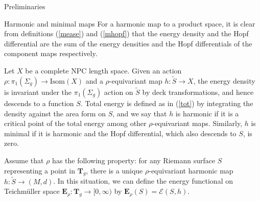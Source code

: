\documentclass[10pt]{amsart}
\theoremstyle{definition}
\begin{document}
\begin{section}{Preliminaries}
\begin{subsection}{Harmonic and minimal maps}
For a harmonic map to a product space, it is clear from definitions (\ref{mease}) and (\ref{mhopf}) that the energy density and the Hopf differential are the sum of the energy densities and the Hopf differentials of the component maps respectively.

Let $X$ be a complete NPC length space. Given an action $\rho:\pi_1(\Sigma_g)\to \textrm{Isom}(X)$ and a $\rho$-equivariant map $h:\tilde{S}\to X$, the energy density is invariant under the $\pi_1(\Sigma_g)$ action on $\tilde{S}$ by deck transformations, and hence descends to a function $S$. Total energy is defined as in (\ref{tot}) by integrating the density against the area form on $S$, and we say that $h$ is harmonic if it is a critical point of the total energy among other $\rho$-equivariant maps. Similarly, $h$ is minimal if it is harmonic and the Hopf differential, which also descends to $S$, is zero.

Assume that $\rho$ has the following property: for any Riemann surface $S$ representing a point in $\mathbf{T}_g$, there is a unique $\rho$-equivariant harmonic map $h:\tilde{S}\to (M,d)$. In this situation, we can define the energy functional on Teichm{\"u}ller space $\mathbf{E}_\rho:\mathbf{T}_g\to [0,\infty)$ by $\mathbf{E}_\rho(S)=\mathcal{E}(S,h).$
\end{subsection}


\end{section}
\end{document}
